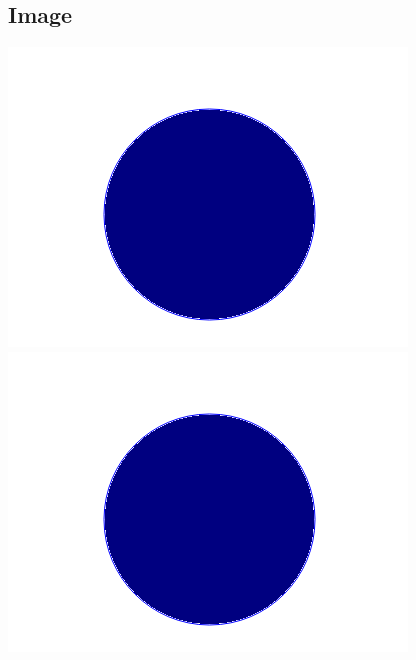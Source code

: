 \documentclass[a4paper]{article}
\begin{document}
    \begin{landscape}
    \section{Image}
    	\includegraphics[width=\textwidth]{test.png}
    	\newpage
    	\noindent\includegraphics[width=\linewidth]{test.png}
    \end{landscape}
    
\end{document}
